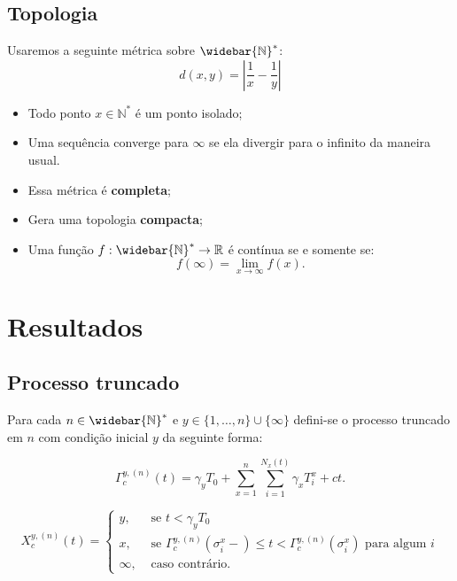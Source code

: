 \documentclass[xcolor=pdftex,dvipsnames]{beamer}
\newcommand{\Nz}{{\mathbb{N^*}}}
\newcommand{\Nzb}{{\mathbb{\widebar{N}^*}}}
\newcommand{\R}{{\mathbb{R}}}
\begin{document}
\subsection{Topologia}

\begin{frame}
  
  Usaremos a seguinte métrica sobre $\Nzb$:
  \begin{displaymath}
    d(x, y) = \left\lvert \frac{1}{x} - \frac{1}{y} \right\rvert
  \end{displaymath}


  \begin{itemize}
  \item<2-> Todo ponto $x \in \Nz$ é um ponto isolado;
  \item<3-> Uma sequência converge para $\infty$ se ela divergir para o
    infinito da maneira usual.
  \item<4-> Essa métrica é {\bf completa};
  \item<5-> Gera uma topologia {\bf compacta};
  \item<6-> Uma função $f: \Nzb \to \R$ é contínua se e somente se:
    \begin{displaymath}
      f(\infty) = \lim_{x \to \infty} f(x) .
    \end{displaymath}
  \end{itemize}

\end{frame}

\section{Resultados}

\subsection{Processo truncado}

\begin{frame}

  Para cada $n \in \Nzb$  e $y \in \{ 1, \ldots, n\} \cup \{ \infty
  \}$ defini-se o processo truncado em $n$ com condição inicial $y$ da
  seguinte forma:


\begin{displaymath}
  \Gamma^{y,(n)}_c (t) = \gamma_y T_0
  + \sum_{x =1}^{n} \sum_{i = 1}^{N_x(t)}
  \gamma_x T_i^x
  + c t.
\end{displaymath}

\begin{displaymath}
   X^{y,(n)}_c(t) = \begin{cases}
    y, & \textrm{ se }  t < \gamma_y T_0 \\
    x, & \textrm{ se } \Gamma^{y,(n)}_c(\sigma_i^x-) \leq t <
    \Gamma^{y,(n)}_c(\sigma^x_i)
    \text{ para algum } i \\
    \infty, & \textrm{ caso contrário.}
  \end{cases}
\end{displaymath}
\end{frame}
\end{document}
